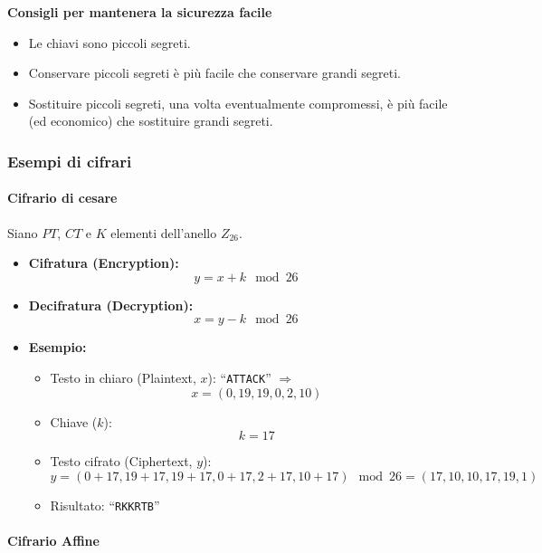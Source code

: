 \documentclass{report}
\begin{document}
            \textbf{Consigli per mantenera la sicurezza facile}
            \begin{itemize}
                \item Le chiavi sono piccoli segreti.
                \item Conservare piccoli segreti è più facile che conservare grandi segreti.
                \item Sostituire piccoli segreti, una volta eventualmente compromessi, è più facile (ed economico) che sostituire grandi segreti.
            \end{itemize}

        \subsubsection{Esempi di cifrari} 
            \paragraph{Cifrario di cesare}

            Siano $PT$, $CT$ e $K$ elementi dell'anello $Z_{26}$.

            \begin{itemize}
                \item \textbf{Cifratura (Encryption):} \[
                y = x + k \mod 26
                \]
                
                \item \textbf{Decifratura (Decryption):} \[
                x = y - k \mod 26
                \]
                
                \item \textbf{Esempio:}
                \begin{itemize}
                    \item Testo in chiaro (Plaintext, $x$): ``\texttt{ATTACK}'' $\Rightarrow$ \[x = (0, 19, 19, 0, 2, 10)\]
                    \item Chiave ($k$): \[k = 17\]
                    \item Testo cifrato (Ciphertext, $y$): \[
                    y = (0+17, 19+17, 19+17, 0+17, 2+17, 10+17) \mod 26 = (17, 10, 10, 17, 19, 1)
                    \]
                    \item Risultato: ``\texttt{RKKRTB}''
                \end{itemize}
            \end{itemize}

            \paragraph{Cifrario Affine}
\end{document}
